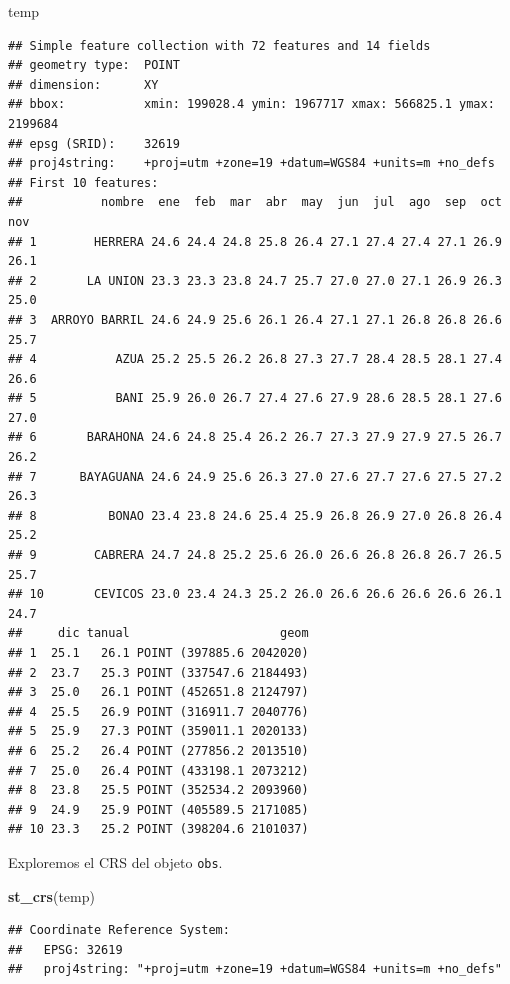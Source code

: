 \documentclass[11pt,]{article}
\newenvironment{Shaded}{\begin{snugshade}}{\end{snugshade}}
\newcommand{\KeywordTok}[1]{\textcolor[rgb]{0.13,0.29,0.53}{\textbf{#1}}}
\newcommand{\NormalTok}[1]{#1}
\begin{document}
\begin{Shaded}
\begin{Highlighting}[]
\NormalTok{temp}
\end{Highlighting}
\end{Shaded}

\begin{verbatim}
## Simple feature collection with 72 features and 14 fields
## geometry type:  POINT
## dimension:      XY
## bbox:           xmin: 199028.4 ymin: 1967717 xmax: 566825.1 ymax: 2199684
## epsg (SRID):    32619
## proj4string:    +proj=utm +zone=19 +datum=WGS84 +units=m +no_defs
## First 10 features:
##           nombre  ene  feb  mar  abr  may  jun  jul  ago  sep  oct  nov
## 1        HERRERA 24.6 24.4 24.8 25.8 26.4 27.1 27.4 27.4 27.1 26.9 26.1
## 2       LA UNION 23.3 23.3 23.8 24.7 25.7 27.0 27.0 27.1 26.9 26.3 25.0
## 3  ARROYO BARRIL 24.6 24.9 25.6 26.1 26.4 27.1 27.1 26.8 26.8 26.6 25.7
## 4           AZUA 25.2 25.5 26.2 26.8 27.3 27.7 28.4 28.5 28.1 27.4 26.6
## 5           BANI 25.9 26.0 26.7 27.4 27.6 27.9 28.6 28.5 28.1 27.6 27.0
## 6       BARAHONA 24.6 24.8 25.4 26.2 26.7 27.3 27.9 27.9 27.5 26.7 26.2
## 7      BAYAGUANA 24.6 24.9 25.6 26.3 27.0 27.6 27.7 27.6 27.5 27.2 26.3
## 8          BONAO 23.4 23.8 24.6 25.4 25.9 26.8 26.9 27.0 26.8 26.4 25.2
## 9        CABRERA 24.7 24.8 25.2 25.6 26.0 26.6 26.8 26.8 26.7 26.5 25.7
## 10       CEVICOS 23.0 23.4 24.3 25.2 26.0 26.6 26.6 26.6 26.6 26.1 24.7
##     dic tanual                     geom
## 1  25.1   26.1 POINT (397885.6 2042020)
## 2  23.7   25.3 POINT (337547.6 2184493)
## 3  25.0   26.1 POINT (452651.8 2124797)
## 4  25.5   26.9 POINT (316911.7 2040776)
## 5  25.9   27.3 POINT (359011.1 2020133)
## 6  25.2   26.4 POINT (277856.2 2013510)
## 7  25.0   26.4 POINT (433198.1 2073212)
## 8  23.8   25.5 POINT (352534.2 2093960)
## 9  24.9   25.9 POINT (405589.5 2171085)
## 10 23.3   25.2 POINT (398204.6 2101037)
\end{verbatim}

Exploremos el CRS del objeto \texttt{obs}.

\begin{Shaded}
\begin{Highlighting}[]
\KeywordTok{st_crs}\NormalTok{(temp)}
\end{Highlighting}
\end{Shaded}

\begin{verbatim}
## Coordinate Reference System:
##   EPSG: 32619 
##   proj4string: "+proj=utm +zone=19 +datum=WGS84 +units=m +no_defs"
\end{verbatim}
\end{document}

